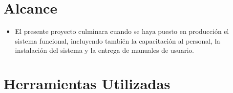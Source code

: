 \begin{large}
\section{Alcance}
\begin{itemize}
    \item El presente proyecto culminara cuando se haya puesto en producción el sistema funcional, incluyendo también la capacitación al personal, la instalación del sistema y la entrega de manuales de usuario.
\end{itemize}\leavevmode
\section*{Herramientas Utilizadas}

\end{large}
\newpage
